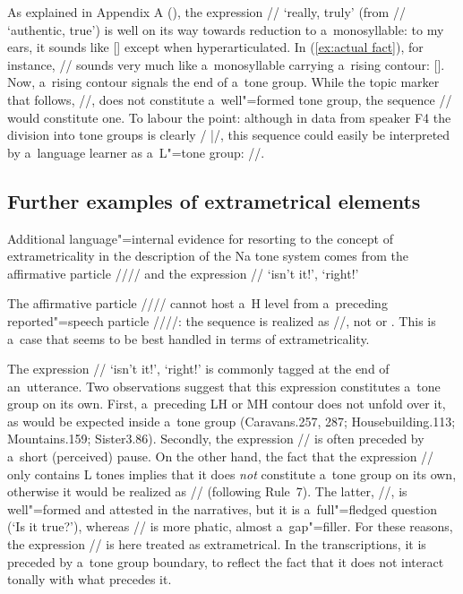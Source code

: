 As explained in Appendix A (), the expression // ‘really, truly’ (from // ‘authentic, true’) is well on its way towards reduction to a~monosyllable: to my ears, it sounds like [] except when hyperarticulated. In (\ref{ex:actual fact}), for instance, // sounds very much like a~monosyllable carrying a~rising contour: []. Now, a~rising contour signals the end of a~tone group. While the topic marker that follows, //, does not constitute a~well"=formed tone group, the sequence // would constitute one. To labour the point: although in data from speaker F4 the division into tone groups is clearly / {\kern2pt}|{\kern2pt}/, this sequence could easily be interpreted by a~language learner as a~L"=tone group: //.

\newpage 
\subsection{Further examples of extrametrical elements}
\label{sec:furtherexamplesofextrametricalelements}

Additional language"=internal evidence for resorting to the concept of
extrametricality in the description of the Na tone system comes from the {affirmative} particle //// and the expression // ‘isn’t it!’, ‘right!’

The
{affirmative} particle //// cannot host a~H level from a~preceding
{reported"=speech} particle ////: the sequence is realized as //, not
 or . This is a~case that seems to be best handled in terms of extrametricality.

The expression // ‘isn’t it!’, ‘right!’ is commonly tagged at the end of an~utterance. Two observations suggest that this expression constitutes a~tone group on
its own. First, a~preceding LH or MH contour does not unfold over it, as would be expected inside a~tone group
(Caravans.257, 287; Housebuilding.113; Mountains.159; Sister3.86). Secondly, the expression // is often preceded by a~short
(perceived) pause. On the other hand, the fact that the expression // only contains L tones
implies that it does \textit{not} constitute a~tone group on its own, otherwise it would be realized as
// (following Rule~7). The latter, //, is well"=formed and attested in the narratives, but it is a~full"=fledged {question} (‘Is it true?’), whereas // is more phatic, almost a~gap"=filler. For these reasons, the expression // is here treated as extrametrical. In the transcriptions,
it is preceded by a~tone group boundary, to reflect the fact that it does not interact tonally with
what precedes it.

